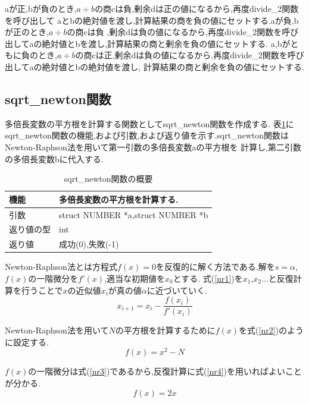 \documentclass[a4j] {jarticle}
\begin{document}
    aが正,bが負のとき,$a\div b$の商cは負,剰余dは正の値になるから,再度divide\_2関数を呼び出して
    aとbの絶対値を渡し,計算結果の商を負の値にセットする.aが負,bが正のとき,$a\div b$の商cは負
    ,剰余dは負の値になるから,再度divide\_2関数を呼び出してaの絶対値とbを渡し,計算結果の商と剰余を負の値にセットする.
    a,bがともに負のとき,$a\div b$の商cは正,剰余dは負の値になるから,再度divide\_2関数を呼び出してaの絶対値とbの絶対値を渡し,
    計算結果の商と剰余を負の値にセットする.

\subsection{sqrt\_newton関数}
多倍長変数の平方根を計算する関数としてsqrt\_newton関数を作成する.
表\ref{sqrt_newton}にsqrt\_newton関数の機能,および引数,および返り値を示す.sqrt\_newton関数はNewton-Raphson法を用いて第一引数の多倍長変数aの平方根を
計算し,第二引数の多倍長変数bに代入する.
\begin{table}[H]
  \caption{sqrt\_newton関数の概要}
  \label{sqrt_newton}
  \begin{center}
      \begin{tabular}{|l|l|}\hline
      機能 & 多倍長変数の平方根を計算する.\\ \hline
      引数 & struct NUMBER *a,struct NUMBER *b\\ \hline
      返り値の型 & int\\ \hline
      返り値 & 成功(0),失敗(-1)\\ \hline
      \end{tabular}
  \end{center}
  \end{table}

  Newton-Raphson法とは方程式$f(x)=0$を反復的に解く方法である.解を$s=\alpha$,$f(x)$の一階微分を$f'(x)$,適当な初期値を$x_0$とする.
  式(\ref{nr1})を$x_1$,$x_2$...と反復計算を行うことで$x$の近似値$x_i$が真の値$\alpha$に近づいていく.
  \begin{equation}
    x_{i+1} = x_i - \frac{f(x_i)}{f'(x_i)}
    \label{nr1}
    \end{equation}
  
    Newton-Raphson法を用いて$N$の平方根を計算するために$f(x)$を式(\ref{nr2})のように設定する.
    \begin{equation}
      f(x) = x^2 -N
      \label{nr2}
      \end{equation}

      $f(x)$の一階微分は式(\ref{nr3})であるから,反復計算に式(\ref{nr4})を用いればよいことが分かる.
      \begin{equation}
        f(x) = 2x
        \label{nr3}
        \end{equation}
\end{document}
